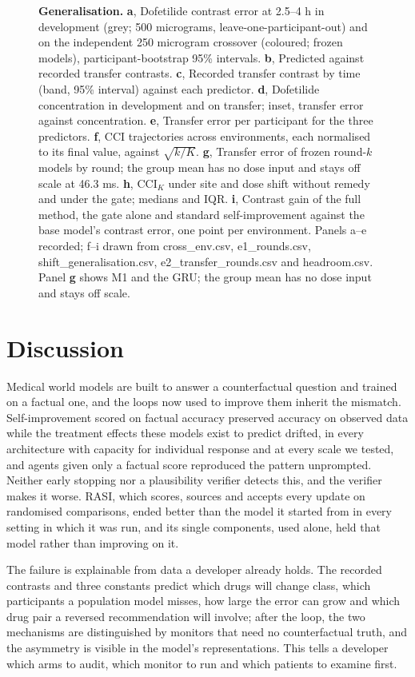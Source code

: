 \documentclass[11pt,a4paper]{article}
\newcommand{\CCI}{\mathrm{CCI}}
\begin{document}
\begin{figure}[!htbp]\centering
{}
\caption{\textbf{Generalisation.} \textbf{a}, Dofetilide contrast error at 2.5--4 h in development (grey; 500 micrograms, leave-one-participant-out) and on the independent 250 microgram crossover (coloured; frozen models), participant-bootstrap 95\% intervals. \textbf{b}, Predicted against recorded transfer contrasts. \textbf{c}, Recorded transfer contrast by time (band, 95\% interval) against each predictor. \textbf{d}, Dofetilide concentration in development and on transfer; inset, transfer error against concentration. \textbf{e}, Transfer error per participant for the three predictors. \textbf{f}, CCI trajectories across environments, each normalised to its final value, against $\sqrt{k/K}$. \textbf{g}, Transfer error of frozen round-$k$ models by round; the group mean has no dose input and stays off scale at 46.3 ms. \textbf{h}, $\CCI_K$ under site and dose shift without remedy and under the gate; medians and IQR. \textbf{i}, Contrast gain of the full method, the gate alone and standard self-improvement against the base model's contrast error, one point per environment. Panels a--e recorded; f--i drawn from cross\_env.csv, e1\_rounds.csv, shift\_generalisation.csv, e2\_transfer\_rounds.csv and headroom.csv. Panel \textbf{g} shows M1 and the GRU; the group mean has no dose input and stays off scale.}\label{fig:general}
\end{figure}
\FloatBarrier
\section{Discussion}
Medical world models are built to answer a counterfactual question and trained on a factual one, and the loops now used to improve them inherit the mismatch. Self-improvement scored on factual accuracy preserved accuracy on observed data while the treatment effects these models exist to predict drifted, in every architecture with capacity for individual response and at every scale we tested, and agents given only a factual score reproduced the pattern unprompted. Neither early stopping nor a plausibility verifier detects this, and the verifier makes it worse. RASI, which scores, sources and accepts every update on randomised comparisons, ended better than the model it started from in every setting in which it was run, and its single components, used alone, held that model rather than improving on it.

The failure is explainable from data a developer already holds. The recorded contrasts and three constants predict which drugs will change class, which participants a population model misses, how large the error can grow and which drug pair a reversed recommendation will involve; after the loop, the two mechanisms are distinguished by monitors that need no counterfactual truth, and the asymmetry is visible in the model's representations. This tells a developer which arms to audit, which monitor to run and which patients to examine first.
\end{document}
